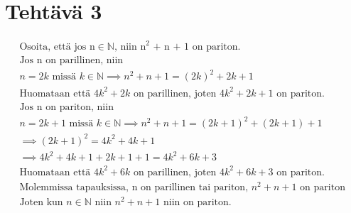 \documentclass{article}
\begin{document}
	\section*{Tehtävä 3}
    \[
        \begin{aligned}
            \text{Osoita, että jos n} \in \mathbb{N} \text{, niin n}^2 \text{ + n + 1 on pariton.} \\[5pt]
            \text{Jos n on parillinen, niin } \\
            n = 2k \text{ missä } k \in \mathbb{N} \implies n^2 + n + 1 = (2k)^2 + 2k + 1 \\
            \text{Huomataan että } 4k^2 + 2k \text{ on parillinen, joten } 4k^2 + 2k + 1 \text{ on pariton.} \\[10pt]
            \text{Jos n on pariton, niin } \\
            n = 2k + 1 \text{ missä } k \in \mathbb{N} \implies  n^2 + n + 1 = (2k + 1)^2 + (2k + 1) + 1 \\
            \implies (2k + 1)^2 = 4k^2 + 4k + 1 \\
            \implies 4k^2 + 4k + 1 + 2k + 1 + 1 = 4k^2 + 6k + 3 \\
            \text{Huomataan että } 4k^2 + 6k \text{ on parillinen, joten } 4k^2 + 6k + 3 \text{ on pariton.} \\[20pt]
            \text{Molemmissa tapauksissa, n on parillinen tai pariton, } n^2 + n + 1 \text{ on pariton } \\
            \text{Joten kun } n \in \mathbb{N} \text{ niin } n^2 + n + 1 \text{ niin on pariton.}
        \end{aligned}
    \]
    \newpage
\end{document}
